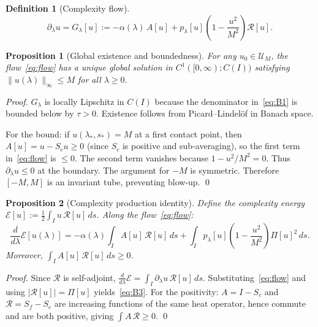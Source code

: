 \documentclass[11pt,a4paper]{article}
\newtheorem{definition}{Definition}
\newtheorem{proposition}{Proposition}
\newcommand{\UM}{\mathcal{U}_M}
\begin{document}
\begin{definition}[Complexity flow]
\label{def:flow}
\begin{equation}\label{eq:flow}
\partial_\lambda u = G_\lambda[u] :=
-\alpha(\lambda)\,A[u]
+ p_\lambda[u]\left(1 - \frac{u^2}{M^2}\right)\mathcal{R}[u]. \tag{F}
\end{equation}
\end{definition}

\begin{proposition}[Global existence and boundedness]
\label{prop:bounded}
For any $u_0 \in \UM$, the flow~\eqref{eq:flow} has a unique global
solution in $C^1([0,\infty); C(I))$ satisfying
$\|u(\lambda)\|_\infty \le M$ for all $\lambda \ge 0$.
\end{proposition}
\begin{proof}
$G_\lambda$ is locally Lipschitz in $C(I)$ because the denominator
in~\eqref{eq:B1} is bounded below by $\tau > 0$.
Existence follows from Picard--Lindel\"of in Banach space.

For the bound: if $u(\lambda_*,s_*) = M$ at a first contact point,
then $A[u] = u - S_c u \ge 0$ (since $S_c$ is positive and sub-averaging),
so the first term in~\eqref{eq:flow} is $\le 0$.
The second term vanishes because $1 - u^2/M^2 = 0$.
Thus $\partial_\lambda u \le 0$ at the boundary.
The argument for $-M$ is symmetric.
Therefore $[-M, M]$ is an invariant tube, preventing blow-up. \qed
\end{proof}

\begin{proposition}[Complexity production identity]
\label{prop:production}
Define the complexity energy $\mathcal{E}[u] := \frac{1}{2}\int_I u\,\mathcal{R}[u]\,ds$.
Along the flow~\eqref{eq:flow}:
\begin{equation}\label{eq:B3}
\frac{d}{d\lambda}\mathcal{E}[u(\lambda)]
= -\alpha(\lambda)\int_I A[u]\,\mathcal{R}[u]\,ds
+ \int_I p_\lambda[u]\left(1-\frac{u^2}{M^2}\right)\Pi[u]^2\,ds.
\tag{B3}
\end{equation}
Moreover, $\int_I A[u]\,\mathcal{R}[u]\,ds \ge 0$.
\end{proposition}
\begin{proof}
Since $\mathcal{R}$ is self-adjoint,
$\frac{d}{d\lambda}\mathcal{E} = \int_I \partial_\lambda u\,\mathcal{R}[u]\,ds$.
Substituting~\eqref{eq:flow} and using $|\mathcal{R}[u]| = \Pi[u]$
yields~\eqref{eq:B3}.
For the positivity: $A = I - S_c$ and $\mathcal{R} = S_f - S_c$ are
increasing functions of the same heat operator, hence commute and
are both positive, giving $\int A\,\mathcal{R} \ge 0$. \qed
\end{proof}
\end{document}
